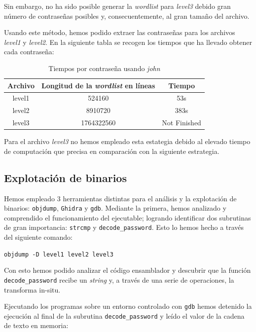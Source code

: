 \documentclass[]{article}
\begin{document}
Sin embargo, no ha sido posible generar la \textit{wordlist} para \textit{level3} debido gran número de contraseñas posibles y, consecuentemente, al gran tamaño del archivo.

Usando este método, hemos podido extraer las contraseñas para los archivos \textit{level1} y \textit{level2}. En la siguiente tabla se recogen los tiempos que ha llevado obtener cada contraseña: 
\begin{table}
\begin{centering}
    \begin{tabular}{|c|c|c|}
        \hline
        Archivo & Longitud de la \textit{wordlist} en líneas & Tiempo\\
        \hline
        level1 & 524160 & 53s\\ 
        level2 & 8910720 & 383s\\
        level3 & 1764322560 & Not Finished\\
        \hline
    \end{tabular}
    \caption {\small Tiempos por contraseña usando \textit{john}}
\end{centering}
\end{table}

Para el archivo \textit{level3} no hemos empleado esta estategia debido al elevado tiempo de computación que precisa en comparación con la siguiente estrategia.

\subsection{Explotación de binarios}
\label{subsec:binary}
Hemos empleado 3 herramientas distintas para el análisis y la explotación de binarios: \texttt{objdump}, \texttt{Ghidra} y \texttt{gdb}. Mediante la primera, hemos analizado y comprendido el funcionamiento del ejecutable; logrando identificar dos subrutinas de gran importancia: \texttt{strcmp} y \texttt{decode\_password}. Esto lo hemos hecho a través del siguiente comando:

\begin{center}\texttt{objdump -D level1 level2 level3}\end{center}

Con esto hemos podido analizar el código ensamblador y descubrir que la función \texttt{decode\_password} recibe un \textit{string} y, a través de una serie de operaciones, la transforma in-situ.

Ejecutando los programas sobre un entorno controlado con \texttt{gdb} hemos detenido la ejecución al final de la subrutina \texttt{decode\_password} y leído el valor de la cadena de texto en memoria:
\end{document}
